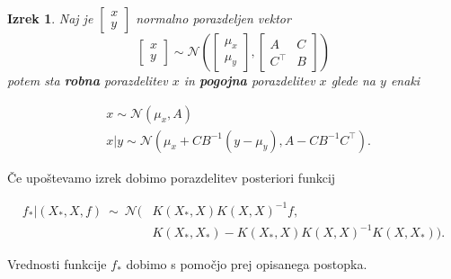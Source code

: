 \documentclass{beamer}
\newtheorem{izrek}[theorem]{Izrek}
\begin{document}
\begin{frame}

\begin{izrek} Naj je $ \begin{bmatrix}
x\\ 
y
\end{bmatrix} $ normalno porazdeljen vektor
\begin{equation}
 \begin{bmatrix}
x\\ 
y
\end{bmatrix} \sim \mathcal{N}(\begin{bmatrix}
\mu_{x}\\ 
\mu_{y}
\end{bmatrix}, \begin{bmatrix}
A & C\\ 
C^\top & B
\end{bmatrix}) 
\end{equation}
potem sta \textbf{robna} porazdelitev $x$ in \textbf{pogojna} porazdelitev $x$ glede na $y$ enaki

\begin{equation}
\begin{split}
& x \sim \mathcal{N} (\mu_{x}, A) \\
& x|y \sim \mathcal{N} (\mu_{x} + CB^{-1}(y-\mu_{y}), A-CB^{-1}C^\top).
\end{split}
\end{equation}
\end{izrek}

\end{frame}
\begin{frame}

Če upoštevamo izrek dobimo porazdelitev posteriori funkcij

\begin{equation}
\begin{split}
f_{*} |( X_{*}, X, f ) ~ \sim ~ \mathcal{N} ( &K(X_{*},X) K(X,X)^{-1} f, \\
& K(X_{*},X_{*}) - K(X_{*},X)K(X,X)^{-1}K(X,X_{*})).
\end{split}
\end{equation}

Vrednosti funkcije $f_{*}$ dobimo s pomočjo prej opisanega postopka. 
\end{frame}
\end{document}
